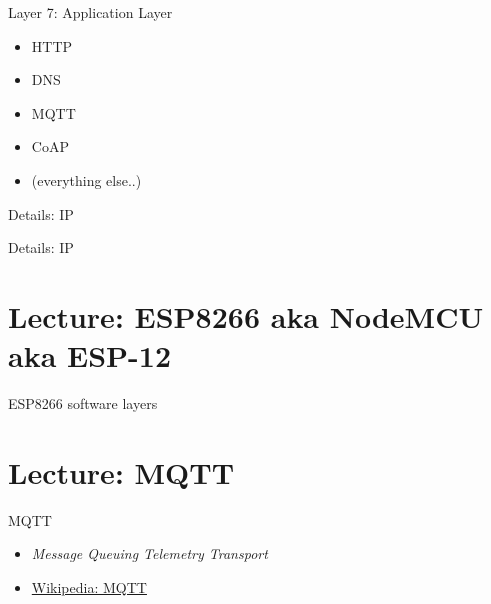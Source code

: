\begin{frame}{Layer 7: Application Layer}
\protect\hypertarget{layer-7-application-layer}{}

\begin{itemize}
\tightlist
\item
  HTTP
\item
  DNS
\item
  MQTT
\item
  CoAP
\item
  (everything else..)
\end{itemize}

\end{frame}

\begin{frame}{Details: IP}
\protect\hypertarget{details-ip}{}


\end{frame}

\begin{frame}{Details: IP}
\protect\hypertarget{details-ip-1}{}

\end{frame}

\hypertarget{lecture-esp8266-aka-nodemcu-aka-esp-12}{%
\section{Lecture: ESP8266 aka NodeMCU aka
ESP-12}\label{lecture-esp8266-aka-nodemcu-aka-esp-12}}

\begin{frame}{ESP8266 software layers}
\protect\hypertarget{esp8266-software-layers}{}

\end{frame}

\hypertarget{lecture-mqtt}{%
\section{Lecture: MQTT}\label{lecture-mqtt}}

\begin{frame}{MQTT}
\protect\hypertarget{mqtt}{}

\begin{itemize}
\tightlist
\item
  \emph{Message Queuing Telemetry Transport}
\item
  \href{https://en.wikipedia.org/wiki/MQTT}{Wikipedia: MQTT}
\end{itemize}


\end{frame}

